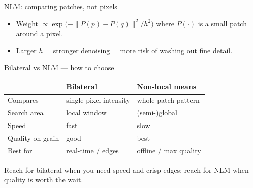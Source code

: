 \documentclass[10pt,aspectratio=169]{beamer}
\begin{document}
\begin{frame}{NLM: comparing patches, not pixels}
  \begin{center}
  \end{center}
  \begin{itemize}
    \item Weight $\propto \exp\!\big(-\|P(p)-P(q)\|^2/h^2\big)$ where $P(\cdot)$ is a small patch around a pixel.
    \item Larger $h$ = stronger denoising = more risk of washing out fine detail.
  \end{itemize}
\end{frame}

\begin{frame}{Bilateral vs NLM — how to choose}
  \begin{center}
  \begin{tabular}{@{}lll@{}}
    \toprule
    & \textbf{Bilateral} & \textbf{Non-local means} \\
    \midrule
    Compares & single pixel intensity & whole patch pattern \\
    Search area & local window & (semi-)global \\
    Speed & fast & slow \\
    Quality on grain & good & best \\
    Best for & real-time / edges & offline / max quality \\
    \bottomrule
  \end{tabular}
  \end{center}
  \begin{goodbox}
    Reach for bilateral when you need speed and crisp edges; reach for NLM when quality is worth the wait.
  \end{goodbox}
\end{frame}
\end{document}
